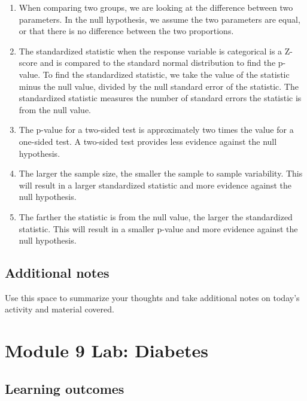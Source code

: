 \documentclass[
]{report}
\begin{document}
\begin{enumerate}
\def\labelenumi{\arabic{enumi}.}
\item
  When comparing two groups, we are looking at the difference between two parameters. In the null hypothesis, we assume the two parameters are equal, or that there is no difference between the two proportions.
\item
  The standardized statistic when the response variable is categorical is a Z-score and is compared to the standard normal distribution to find the p-value. To find the standardized statistic, we take the value of the statistic minus the null value, divided by the null standard error of the statistic. The standardized statistic measures the number of standard errors the statistic is from the null value.
\item
  The p-value for a two-sided test is approximately two times the value for a one-sided test. A two-sided test provides less evidence against the null hypothesis.
\item
  The larger the sample size, the smaller the sample to sample variability. This will result in a larger standardized statistic and more evidence against the null hypothesis.
\item
  The farther the statistic is from the null value, the larger the standardized statistic. This will result in a smaller p-value and more evidence against the null hypothesis.
\end{enumerate}

\hypertarget{additional-notes-15}{%
\subsection{Additional notes}\label{additional-notes-15}}

Use this space to summarize your thoughts and take additional notes on today's activity and material covered.

\newpage

\hypertarget{module-9-lab-diabetes}{%
\section{Module 9 Lab: Diabetes}\label{module-9-lab-diabetes}}


\hypertarget{learning-outcomes-19}{%
\subsection{Learning outcomes}\label{learning-outcomes-19}}
\end{document}
